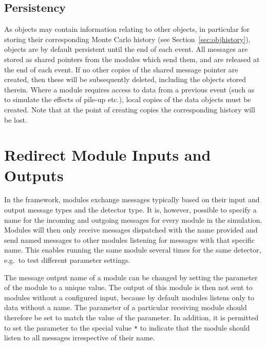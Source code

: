 \subsection{Persistency}
\label{ch:objects_persistency}
As objects may contain information relating to other objects, in particular for storing their corresponding Monte Carlo history (see Section~\ref{sec:objhistory}), objects are by default persistent until the end of each event. All messages are stored as shared pointers from the modules which send them, and are released at the end of each event. If no other copies of the shared message pointer are created, then these will be subsequently deleted, including the objects stored therein. Where a module requires access to data from a previous event (such as to simulate the effects of pile-up etc.), local copies of the data objects must be created. Note that at the point of creating copies the corresponding history will be lost.


\section{Redirect Module Inputs and Outputs}
\label{sec:redirect_module_input_outputs}
In the \apsq framework, modules exchange messages typically based on their input and output message types and the detector type.
It is, however, possible to specify a name for the incoming and outgoing messages for every module in the simulation.
Modules will then only receive messages dispatched with the name provided and send named messages to other modules listening for messages with that specific name.
This enables running the same module several times for the same detector, e.g.\ to test different parameter settings.

The message output name of a module can be changed by setting the  parameter of the module to a unique value.
The output of this module is then not sent to modules without a configured input, because by default modules listens only to data without a name.
The  parameter of a particular receiving module should therefore be set to match the value of the  parameter.
In addition, it is permitted to set the  parameter to the special value \texttt{*} to indicate that the module should listen to all messages irrespective of their name.

